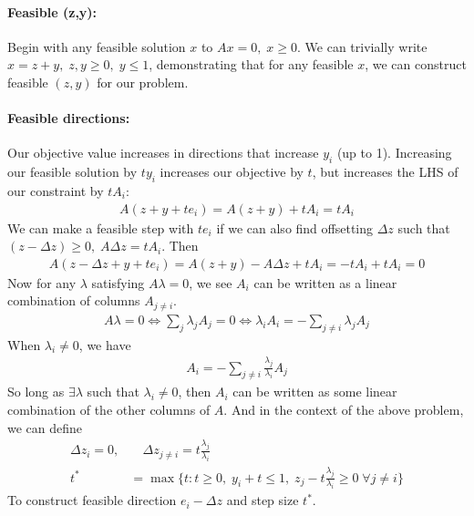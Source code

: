 \documentclass[12pt]{exam}
\begin{document}
\begin{questions}
\begin{parts}
        \paragraph{Feasible (z,y):} Begin with any feasible solution $x$ to $Ax = 0,\; x \geq 0$. We can trivially write $x = z + y,\; z,y \geq 0,\; y \leq 1$, demonstrating that for any feasible $x$, we can construct feasible $(z,y)$ for our problem.
        
        \paragraph{Feasible directions:} Our objective value increases in directions that increase $y_i$ (up to 1). Increasing our feasible solution by $ty_i$ increases our objective by $t$, but increases the LHS of our constraint by $tA_i$:
        \begin{align*}
            A(z + y + te_i) = A(z + y) + tA_i = tA_i
        \end{align*}
        We can make a feasible step with $te_i$ if we can also find offsetting $\Delta z$ such that $(z - \Delta z) \geq 0,\; A\Delta z = tA_i$. Then
        \begin{align*}
            A(z -\Delta z + y + te_i) = A(z + y) - A\Delta z + tA_i = -tA_i + tA_i = 0
        \end{align*}
        Now for any $\lambda$ satisfying $A\lambda = 0$, we see $A_i$ can be written as a linear combination of columns $A_{j\neq i}$.
        \begin{align*}
            A\lambda = 0 \Longleftrightarrow \sum_j \lambda_jA_j = 0 \Longleftrightarrow \lambda_iA_i = - \sum_{j\neq i}\lambda_j A_j
        \end{align*}
         When $\lambda_i \neq 0$, we have
        \begin{align*}
            A_i = -\sum_{j\neq i} \frac{\lambda_j}{\lambda_i}A_j
        \end{align*}
        So long as $\exists \lambda$ such that $\lambda_i \neq 0$, then $A_i$ can be written as some linear combination of the other columns of $A$. And in the context of the above problem, we can define
        \begin{align*}
            \Delta z_i = 0,&\quad \Delta z_{j \neq i} = t\frac{\lambda_j}{\lambda_i}\\
            t^* &= \max\{t : t\geq 0,\; y_i + t \leq 1, \; z_j - t\frac{\lambda_j}{\lambda_i} \geq 0 \;\forall j\neq i\} 
        \end{align*}
        To construct feasible direction $e_i - \Delta z$ and step size $t^*$.

\end{parts}
\end{questions}
\end{document}
